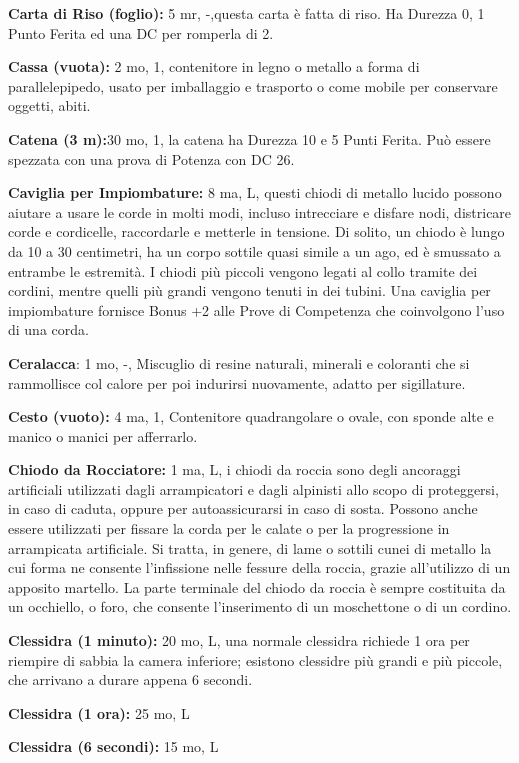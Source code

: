 \documentclass[a4paper,11pt,twoside,openany]{book}
\begin{document}
{\textbf{Carta di Riso (foglio):} 5 mr, -,questa carta è fatta di riso. Ha Durezza 0, 1 Punto Ferita ed una DC per romperla di 2.

\textbf{Cassa (vuota):} 2 mo, 1, contenitore in legno o metallo a forma di parallelepipedo, usato per imballaggio e trasporto o come mobile per conservare oggetti, abiti. 

\textbf{Catena (3 m):}30 mo, 1, la catena ha Durezza 10 e 5 Punti Ferita. Può essere spezzata con una prova di Potenza con DC 26.

\textbf{Caviglia per Impiombature:} 8 ma, L, questi chiodi di metallo lucido possono aiutare a usare le corde in molti modi, incluso intrecciare e disfare nodi, districare corde e cordicelle, raccordarle e metterle in tensione. Di solito, un chiodo è lungo da 10 a 30 centimetri, ha un corpo sottile quasi simile a un ago, ed è smussato a entrambe le estremità. I chiodi più piccoli vengono legati al collo tramite dei cordini, mentre quelli più grandi vengono tenuti in dei tubini. Una caviglia per impiombature fornisce Bonus +2 alle Prove di Competenza che coinvolgono l'uso di una corda. 

\textbf{Ceralacca}: 1 mo, -, Miscuglio di resine naturali, minerali e coloranti che si rammollisce col calore per poi indurirsi nuovamente, adatto per sigillature.

\textbf{Cesto (vuoto):} 4 ma, 1, Contenitore quadrangolare o ovale, con sponde alte e manico o manici per afferrarlo.

\textbf{Chiodo da Rocciatore:} 1 ma, L, i chiodi da roccia sono degli ancoraggi artificiali utilizzati dagli arrampicatori e dagli alpinisti allo scopo di proteggersi, in caso di caduta, oppure per autoassicurarsi in caso di sosta. Possono anche essere utilizzati per fissare la corda per le calate o per la progressione in arrampicata artificiale. Si tratta, in genere, di lame o sottili cunei di metallo la cui forma ne consente l'infissione nelle fessure della roccia, grazie all'utilizzo di un apposito martello. La parte terminale del chiodo da roccia è sempre costituita da un occhiello, o foro, che consente l'inserimento di un moschettone o di un cordino.

\textbf{Clessidra (1 minuto):} 20 mo, L, una normale clessidra richiede 1 ora per riempire di sabbia la camera inferiore; esistono clessidre più grandi e più piccole, che arrivano a durare appena 6
secondi.

\textbf{Clessidra (1 ora):} 25 mo, L

\textbf{Clessidra (6 secondi):} 15 mo, L

}
\end{document}
